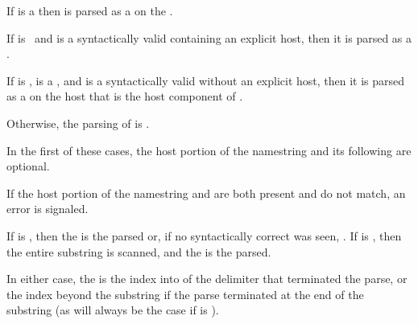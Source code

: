 \itemitem{\bull} 
  If  is a  then  is parsed
  as a   
  on the .

\itemitem{\bull}
  If  is \nil\ and  is a syntactically valid 
    containing an explicit host,
  then it is parsed as a  .

\itemitem{\bull}
  If   is \nil,
       is a ,
  and  is a syntactically valid  
       without an explicit host,
  then it is parsed as a  
        on the host that is the host component of .

\itemitem{\bull}
  Otherwise, the parsing of  is .

\endlist

In the first 
of these
cases,
the host portion of the  namestring
and its following  are optional.

If the host portion of the namestring and  
are both present and do not match,
an error is signaled.               

If  is ,
then the  is the  parsed 
or, if no syntactically correct  was seen, \nil.
If  is ,
then the entire substring is scanned, 
and the  is the  parsed.

In either case, the 
is the index into  of the delimiter that terminated the parse,
or the index beyond the substring if the parse terminated at the end of the substring
  (as will always be the case if  is ).

